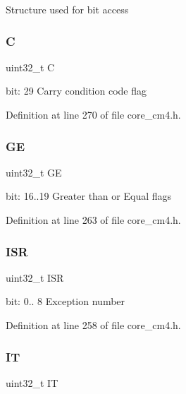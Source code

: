 Structure used for bit access \mbox{\label{unionx_p_s_r___type_a7a1caf92f32fe9ebd8d1fe89b06c7776}} 
\subsubsection{\texorpdfstring{C}{C}}
{\footnotesize\ttfamily uint32\+\_\+t C}

bit\+: 29 Carry condition code flag 

Definition at line 270 of file core\+\_\+cm4.\+h.

\mbox{\label{unionx_p_s_r___type_aa91800ec6e90e457c7a1acd1f2e17099}} 
\subsubsection{\texorpdfstring{GE}{GE}}
{\footnotesize\ttfamily uint32\+\_\+t GE}

bit\+: 16..19 Greater than or Equal flags 

Definition at line 263 of file core\+\_\+cm4.\+h.

\mbox{\label{unionx_p_s_r___type_ad502ba7dbb2aab5f87c782b28f02622d}} 
\subsubsection{\texorpdfstring{I\+SR}{ISR}}
{\footnotesize\ttfamily uint32\+\_\+t I\+SR}

bit\+: 0.. 8 Exception number 

Definition at line 258 of file core\+\_\+cm4.\+h.

\mbox{\label{unionx_p_s_r___type_a76485660fe8ad98cdc71ddd7cb0ed777}} 
\subsubsection{\texorpdfstring{IT}{IT}}
{\footnotesize\ttfamily uint32\+\_\+t IT}

